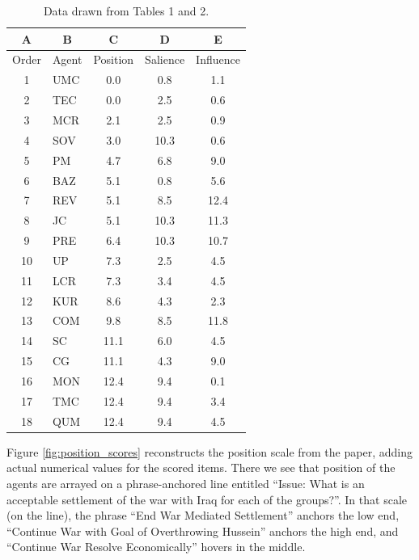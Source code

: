 \begin{table}[h]
\centering
\begin{tabular}{clccc}
\hline
A & \multicolumn{1}{c}{B} & C & D & E \\ \hline
Order & \multicolumn{1}{c}{Agent} &	 Position %
& Salience %
& Influence %
\\
\hline\hline
1 & UMC & 	0.0	& 0.8	 & 1.1 \\
2 & TEC	& 0.0	& 2.5	 & 0.6 \\
3 & MCR	 & 2.1 & 2.5	& 0.9 \\
4 & SOV	& 3.0 & 10.3	 & 0.6 \\
5 & PM & 4.7 & 	6.8	& 9.0 \\
6 & BAZ	& 5.1  &	0.8 & 	5.6\\
7 & REV	& 5.1	 & 8.5 &	12.4 \\
8 & JC	& 5.1 & 	10.3	& 11.3 \\
9 & PRE &	6.4	& 10.3	& 10.7 \\
10 & UP	& 7.3 & 	2.5	& 4.5 \\
11 & LCR	& 7.3	 &  3.4	& 4.5 \\
12 & KUR &	8.6	& 4.3	 & 2.3 \\
13 & COM	 & 9.8 &	8.5	& 11.8 \\
14 & SC &	11.1	& 6.0	& 4.5 \\  %
15 & CG	& 11.1 &	4.3 & 	9.0 \\
16 & MON	 & 12.4 &	9.4	& 0.1 \\
17 & TMC	 & 12.4	& 9.4  &	3.4 \\
18 & QUM	 & 12.4 &	9.4 & 	4.5 \\
\hline
\end{tabular}
\caption{Data drawn from \cite{mesquita_1984} Tables 1 and 2.}
\label{table:mesquita_data_1984}
\end{table}



\newpage
 
 Figure \ref{fig:position_scores} reconstructs the   {position} scale from the paper, adding actual numerical values for the scored items.  
 There we see that    {position} of the agents are arrayed on a phrase-anchored line entitled ``Issue: What is an acceptable settlement of the war with Iraq for each of the groups?''.  In that scale (on the line), the phrase ``End War Mediated Settlement''  anchors the low end, ``Continue War with Goal of  Overthrowing Hussein'' anchors the high end, and ``Continue War  Resolve Economically'' hovers in the middle. %
 
